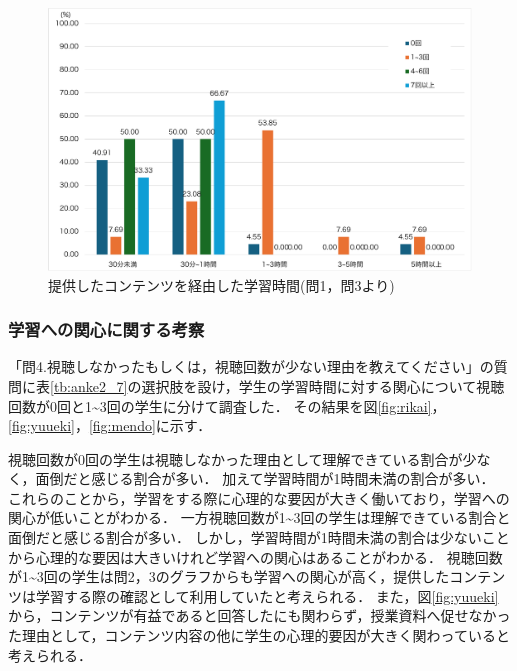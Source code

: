 \documentclass[12pt,a4j,titlepage]{ltjsarticle}
\begin{document}
\begin{figure}[!htb]
  \centering
  \includegraphics[width=15cm]{視聴回数別学習時間.pdf}
  \caption{提供したコンテンツを経由した学習時間(問1，問3より)}
  \label{fig:jikan2}
\end{figure}

\clearpage

\subsubsection{学習への関心に関する考察}

「問4.視聴しなかったもしくは，視聴回数が少ない理由を教えてください」の質問に表\ref{tb:anke2_7}の選択肢を設け，学生の学習時間に対する関心について視聴回数が0回と1\textasciitilde3回の学生に分けて調査した．
その結果を図\ref{fig:rikai}，\ref{fig:yuueki}，\ref{fig:mendo}に示す．

視聴回数が0回の学生は視聴しなかった理由として理解できている割合が少なく，面倒だと感じる割合が多い．
加えて学習時間が1時間未満の割合が多い．
これらのことから，学習をする際に心理的な要因が大きく働いており，学習への関心が低いことがわかる．
一方視聴回数が1\textasciitilde3回の学生は理解できている割合と面倒だと感じる割合が多い．
しかし，学習時間が1時間未満の割合は少ないことから心理的な要因は大きいけれど学習への関心はあることがわかる．
視聴回数が1\textasciitilde3回の学生は問2，3のグラフからも学習への関心が高く，提供したコンテンツは学習する際の確認として利用していたと考えられる．
また，図\ref{fig:yuueki}から，コンテンツが有益であると回答したにも関わらず，授業資料へ促せなかった理由として，コンテンツ内容の他に学生の心理的要因が大きく関わっていると考えられる．
\end{document}
